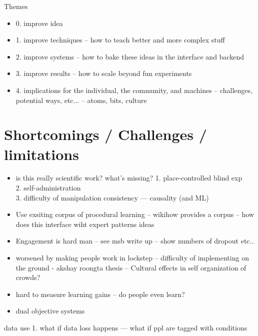 Themes
\begin{itemize}
\item 0. improve idea
\item 1. improve techniques  -- how to teach better and more complex stuff
\item 2. improve systems -- how to bake these ideas in the interface and backend
\item 3. improve results -- how to scale beyond fun experiments
\item 4. implications for the individual, the community, and machines -- challenges, potential ways, etc... -- atoms, bits, culture
\end{itemize}

\section{Shortcomings / Challenges / limitations}
\begin{itemize}
\item is this really scientific work? what’s missing?
1. place-controlled blind exp \\
2. self-administration \\
3. difficulty of manipulation consistency 
---  causality (and ML)   
\item Use exsiting corpus of procedural learning -- wikihow provides a corpus -- how does this interface wiht expert patterns ideas
\item Engagement is hard man -- see msb write up -- show numbers of dropout etc..
\item worsened by making people work in lockstep --  difficulty of implementing on the ground - akshay roongta thesis -- Cultural effects in self organization of crowds?
\item hard to measure learning gains -- do people even learn?
\item dual objective systems

\end{itemize}


data use
1. what if data loss happens — what if ppl are tagged with conditions 




